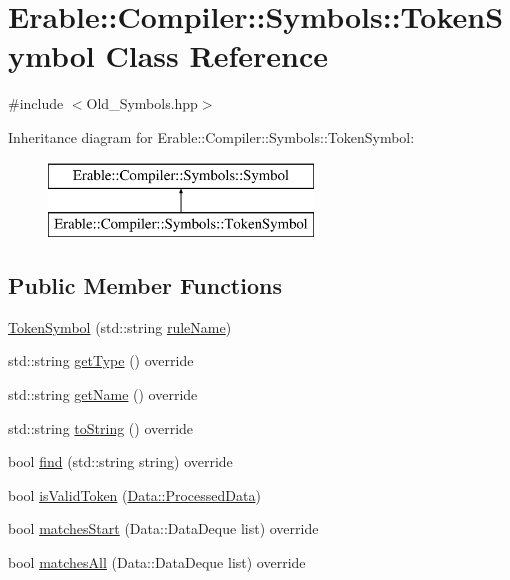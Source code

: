 \hypertarget{class_erable_1_1_compiler_1_1_symbols_1_1_token_symbol}{}\section{Erable\+::Compiler\+::Symbols\+::Token\+Symbol Class Reference}
\label{class_erable_1_1_compiler_1_1_symbols_1_1_token_symbol}


{\ttfamily \#include $<$Old\+\_\+\+Symbols.\+hpp$>$}

Inheritance diagram for Erable\+::Compiler\+::Symbols\+::Token\+Symbol\+:\begin{figure}[H]
\begin{center}
\leavevmode
\includegraphics[height=2.000000cm]{class_erable_1_1_compiler_1_1_symbols_1_1_token_symbol}
\end{center}
\end{figure}
\subsection*{Public Member Functions}
\begin{DoxyCompactItemize}
\item 
\mbox{\hyperlink{class_erable_1_1_compiler_1_1_symbols_1_1_token_symbol_a4c1e8ae7336204598cc0f614a9edbb26}{Token\+Symbol}} (std\+::string \mbox{\hyperlink{class_erable_1_1_compiler_1_1_symbols_1_1_token_symbol_aedef0a5b3fef634067b62c93934ecb08}{rule\+Name}})
\item 
std\+::string \mbox{\hyperlink{class_erable_1_1_compiler_1_1_symbols_1_1_token_symbol_ab80bcf5e531cee5fbb5fe798449e4cbb}{get\+Type}} () override
\item 
std\+::string \mbox{\hyperlink{class_erable_1_1_compiler_1_1_symbols_1_1_token_symbol_a2d9a65967a330721741d7f13ec299745}{get\+Name}} () override
\item 
std\+::string \mbox{\hyperlink{class_erable_1_1_compiler_1_1_symbols_1_1_token_symbol_a0f8499152ff070ae70295c9b25b25b93}{to\+String}} () override
\item 
bool \mbox{\hyperlink{class_erable_1_1_compiler_1_1_symbols_1_1_token_symbol_ad1946e481bf759d24425afbd869248fd}{find}} (std\+::string string) override
\item 
bool \mbox{\hyperlink{class_erable_1_1_compiler_1_1_symbols_1_1_token_symbol_af55a8939414a0b0ddf7302f6eb0cc77e}{is\+Valid\+Token}} (\mbox{\hyperlink{struct_erable_1_1_compiler_1_1_data_1_1_processed_data}{Data\+::\+Processed\+Data}})
\item 
bool \mbox{\hyperlink{class_erable_1_1_compiler_1_1_symbols_1_1_token_symbol_a0bc1350eeca0c23ef97f454589734ede}{matches\+Start}} (Data\+::\+Data\+Deque list) override
\item 
bool \mbox{\hyperlink{class_erable_1_1_compiler_1_1_symbols_1_1_token_symbol_a89e31223762aafe7f77d545595a6e4ef}{matches\+All}} (Data\+::\+Data\+Deque list) override
\end{DoxyCompactItemize}
